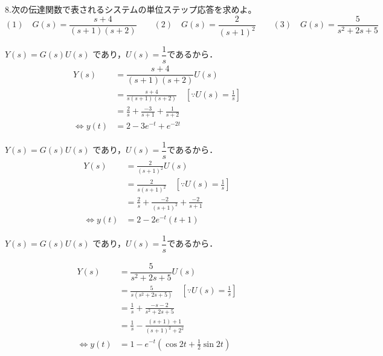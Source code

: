 \documentclass[a4paper,12pt]{article}
\begin{document}
\vspace{2mm}

8.次の伝達関数で表されるシステムの単位ステップ応答を求めよ。\\
\[
(1) \quad G(s) = \frac{s+4}{(s+1)(s+2)} \qquad
(2) \quad G(s) = \frac{2}{(s+1)^2} \qquad
(3) \quad G(s) = \frac{5}{s^2+2s+5}
\]

\begin{tcolorbox}[title={8.(1) \(G(s) = \dfrac{s+4}{(s+1)(s+2)}\) }]

    \qquad \(Y(s) =G(s)U(s)\) であり，\(U(s)=\dfrac{1}{s}\)であるから． 
    \begin{align*}
        Y(s)
        &= \dfrac{s+4}{(s+1)(s+2)}U(s) \\
        &= \frac{s+4}{s(s+1)(s+2)} \quad [\because U(s)=\frac{1}{s}]\\
        &= \frac{2}{s} + \frac{-3}{s+1} + \frac{1}{s+2}\\
        \Leftrightarrow y(t) &=2 - 3e^{-t} + e^{-2t}
    \end{align*}

\end{tcolorbox}

\begin{tcolorbox}[title={8.(2) \(G(s) = \dfrac{2}{(s+1)^2}\) }]

    \qquad \(Y(s) =G(s)U(s)\) であり，\(U(s)=\dfrac{1}{s}\)であるから． 
    \begin{align*}
        Y(s)
        &= \frac{2}{(s+1)^2}U(s) \\
        &= \frac{2}{s(s+1)^2} \quad [\because U(s)=\frac{1}{s}]\\
        &= \frac{2}{s} + \frac{-2}{(s+1)^2} + \frac{-2}{s+1}\\
        \Leftrightarrow y(t) &=2 - 2e^{-t}(t+1) 
    \end{align*}

\end{tcolorbox}

\begin{tcolorbox}[title={8.(3) \(G(s) = \dfrac{5}{s^2+2s+5}\) }]

    \qquad \(Y(s) =G(s)U(s)\) であり，\(U(s)=\dfrac{1}{s}\)であるから． 

    \begin{align*}
        Y(s)
        &= \dfrac{5}{s^2+2s+5}U(s) \\
        &= \frac{5}{s(s^2+2s+5)} \quad [\because U(s)=\frac{1}{s}]\\
        &= \frac{1}{s} + \frac{-s-2}{s^2+2s+5}\\
        &= \frac{1}{s} - \frac{(s+1)+1}{(s+1)^2+2^2}\\
        \Leftrightarrow y(t) &=1-e^{-t}(\cos 2t + \frac{1}{2} \sin 2t) 
    \end{align*}

\end{tcolorbox}
\end{document}
